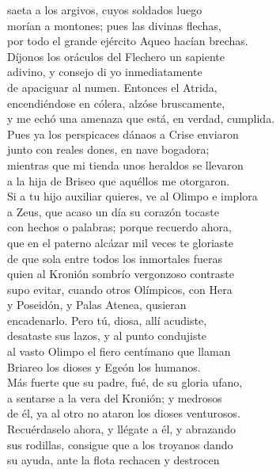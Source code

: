 \documentclass[11pt,twoside]{article}
\begin{document}
saeta a los argivos, cuyos soldados luego\\
morían a montones; pues las divinas flechas,\\
por todo el grande ejército Aqueo hacían brechas.\\
Díjonos los oráculos del Flechero un sapiente\\
adivino, y consejo di yo inmediatamente\\
de apaciguar al numen. Entonces el Atrida,\\
encendiéndose en cólera, alzóse bruscamente,\\
y me echó una amenaza que está, en verdad, cumplida.\\
Pues ya los perspicaces dánaos a Crise enviaron\\
junto con reales dones, en nave bogadora;\\
mientras que mi tienda unos heraldos se llevaron\\
a la hija de Briseo que aquéllos me otorgaron.\\
Si a tu hijo auxiliar quieres, ve al Olimpo e implora\\
a Zeus, que acaso un día su corazón tocaste\\
con hechos o palabras; porque recuerdo ahora,\\
que en el paterno alcázar mil veces te gloriaste\\
de que sola entre todos los inmortales fueras\\
quien al Kronión sombrío vergonzoso contraste\\
supo evitar, cuando otros Olímpicos, con Hera\\
y Poseidón, y Palas Atenea, qusieran\\
encadenarlo. Pero tú, diosa, allí acudiste,\\
desataste sus lazos, y al punto condujiste\\
al vasto Olimpo el fiero centímano que llaman\\
Briareo los dioses y Egeón los humanos.\\
Más fuerte que su padre, fué, de su gloria ufano,\\
a sentarse a la vera del Kronión; y medrosos\\
de él, ya al otro no ataron los dioses venturosos.\\
Recuérdaselo ahora, y llégate a él, y abrazando\\
sus rodillas, consigue que a los troyanos dando\\
su ayuda, ante la flota rechacen y destrocen\\
\end{document}

